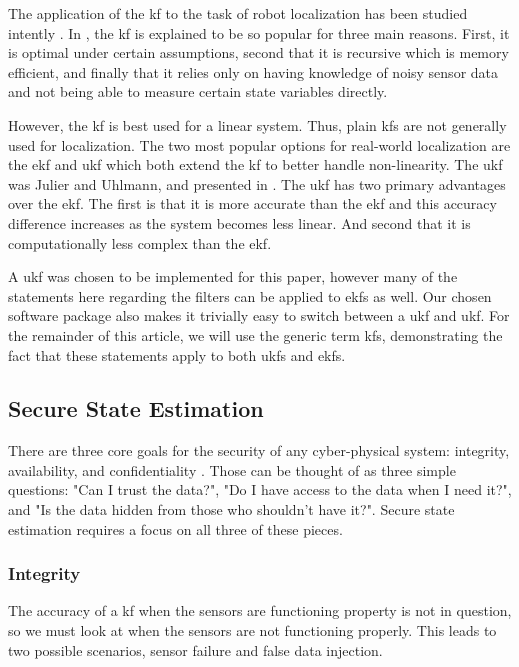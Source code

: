 \documentclass[conference]{IEEEtran}
\begin{document}
The application of the \gls{kf} to the task of robot localization has been studied intently \cite{Localization2003, Mohsin2014}. In \cite{Mohsin2014}, the \gls{kf} is explained to be so popular for three main reasons. First, it is optimal under certain assumptions, second that it is recursive which is memory efficient, and finally that it relies only on having knowledge of noisy sensor data and not being able to measure certain state variables directly.

However, the \gls{kf} is best used for a linear system. Thus, plain \glspl{kf} are not generally used for localization. The two most popular options for real-world localization are the \gls{ekf} and \gls{ukf} which both extend the \gls{kf} to better handle non-linearity. The \gls{ukf} was Julier and Uhlmann, and presented in \cite{Julier1997}. The \gls{ukf} has two primary advantages over the \gls{ekf}. The first is that it is more accurate than the \gls{ekf} and this accuracy difference increases as the system becomes less linear. And second that it is computationally less complex than the \gls{ekf}.

A \gls{ukf} was chosen to be implemented for this paper, however many of the statements here regarding the filters can be applied to \glspl{ekf} as well. Our chosen software package also makes it trivially easy to switch between a \gls{ukf} and \gls{ukf}. For the remainder of this article, we will use the generic term \glspl{kf}, demonstrating the fact that these statements apply to both \glspl{ukf} and \glspl{ekf}.

\subsection{Secure State Estimation}
There are three core goals for the security of any cyber-physical system: integrity, availability, and confidentiality \cite{Cardenas2008}. Those can be thought of as three simple questions: "Can I trust the data?", "Do I have access to the data when I need it?", and "Is the data hidden from those who shouldn't have it?". Secure state estimation requires a focus on all three of these pieces.

\subsubsection{Integrity}
The accuracy of a \gls{kf} when the sensors are functioning property is not in question, so we must look at when the sensors are not functioning properly. This leads to two possible scenarios, sensor failure and false data injection.
\end{document}
